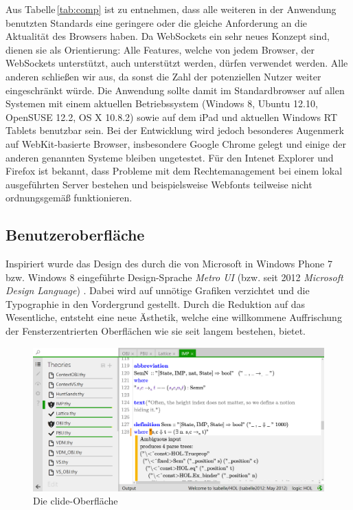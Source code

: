 Aus Tabelle\,\ref{tab:comp} ist zu entnehmen, dass alle weiteren in der Anwendung benutzten
Standards eine geringere oder die gleiche Anforderung an die Aktualität des Browsers haben. Da
WebSockets ein sehr neues Konzept sind, dienen sie als Orientierung: Alle Features, welche von
jedem Browser, der WebSockets unterstützt, auch unterstützt werden, dürfen verwendet werden. Alle
anderen schließen wir aus, da sonst die Zahl der potenziellen Nutzer weiter eingeschränkt würde. Die
Anwendung sollte damit im Standardbrowser auf allen Systemen mit einem aktuellen Betriebssystem
(Windows 8, Ubuntu 12.10, OpenSUSE 12.2, OS X 10.8.2) sowie auf dem iPad und aktuellen Windows RT
Tablets benutzbar sein. Bei der Entwicklung wird jedoch besonderes Augenmerk auf WebKit-basierte
Browser, insbesondere Google Chrome gelegt und einige der anderen genannten Systeme bleiben
ungetestet. Für den Intenet Explorer und Firefox ist bekannt, dass Probleme mit dem
Rechtemanagement bei einem lokal ausgeführten Server bestehen und beispielsweise Webfonts teilweise
nicht ordnungsgemäß funktionieren.

\subsection{Benutzeroberfläche}

Inspiriert wurde das Design des  durch die von Microsoft in Windows Phone 7 bzw. Windows 8
eingeführte Design-Sprache \textit{Metro UI} (bzw. seit 2012 \textit{Microsoft Design Language})
\cite{metroui}. Dabei wird auf unnötige Grafiken verzichtet und die Typographie in den Vordergrund
gestellt. Durch die Reduktion auf das Wesentliche, entsteht eine neue Ästhetik, welche eine
willkommene Auffrischung der Fensterzentrierten Oberflächen wie sie seit langem bestehen, bietet.

\begin{figure}[ht]
\includegraphics[width=\linewidth]{images/screen-main}
  \caption{Die clide-Oberfläche}
  \label{fig:screen-main}
\end{figure}

